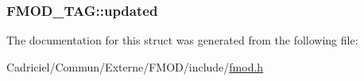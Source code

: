 \hypertarget{struct_f_m_o_d___t_a_g_a0358f4afc9957d3d3254691c3118d90a}{
\subsubsection[{updated}]{ F\-M\-O\-D\-\_\-\-T\-A\-G\-::updated}}\label{struct_f_m_o_d___t_a_g_a0358f4afc9957d3d3254691c3118d90a}


The documentation for this struct was generated from the following file\-:\begin{DoxyCompactItemize}
\item 
Cadriciel/\-Commun/\-Externe/\-F\-M\-O\-D/include/\hyperlink{fmod_8h}{fmod.\-h}\end{DoxyCompactItemize}
